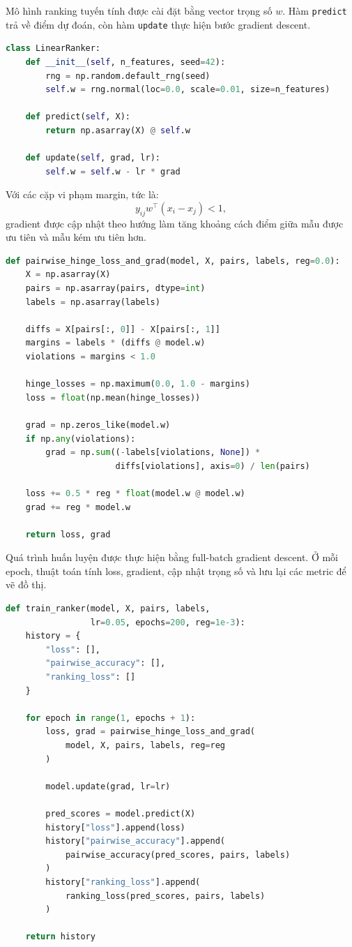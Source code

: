Mô hình ranking tuyến tính được cài đặt bằng vector trọng số \(w\). Hàm \texttt{predict} trả về điểm dự đoán, còn hàm \texttt{update} thực hiện bước gradient descent.

\begin{lstlisting}[language=Python, caption={Mô hình scoring tuyến tính cho pairwise ranking}]
class LinearRanker:
    def __init__(self, n_features, seed=42):
        rng = np.random.default_rng(seed)
        self.w = rng.normal(loc=0.0, scale=0.01, size=n_features)

    def predict(self, X):
        return np.asarray(X) @ self.w

    def update(self, grad, lr):
        self.w = self.w - lr * grad
\end{lstlisting}

Với các cặp vi phạm margin, tức là:
\[
    y_{ij}w^\top(x_i-x_j)<1,
\]
gradient được cập nhật theo hướng làm tăng khoảng cách điểm giữa mẫu được ưu tiên và mẫu kém ưu tiên hơn.

\begin{lstlisting}[language=Python, caption={Pairwise hinge loss và gradient}]
def pairwise_hinge_loss_and_grad(model, X, pairs, labels, reg=0.0):
    X = np.asarray(X)
    pairs = np.asarray(pairs, dtype=int)
    labels = np.asarray(labels)

    diffs = X[pairs[:, 0]] - X[pairs[:, 1]]
    margins = labels * (diffs @ model.w)
    violations = margins < 1.0

    hinge_losses = np.maximum(0.0, 1.0 - margins)
    loss = float(np.mean(hinge_losses))

    grad = np.zeros_like(model.w)
    if np.any(violations):
        grad = np.sum((-labels[violations, None]) *
                      diffs[violations], axis=0) / len(pairs)

    loss += 0.5 * reg * float(model.w @ model.w)
    grad += reg * model.w

    return loss, grad
\end{lstlisting}

Quá trình huấn luyện được thực hiện bằng full-batch gradient descent. Ở mỗi epoch, thuật toán tính loss, gradient, cập nhật trọng số và lưu lại các metric để vẽ đồ thị.

\begin{lstlisting}[language=Python, caption={Vòng lặp huấn luyện bằng gradient descent}]
def train_ranker(model, X, pairs, labels,
                 lr=0.05, epochs=200, reg=1e-3):
    history = {
        "loss": [],
        "pairwise_accuracy": [],
        "ranking_loss": []
    }

    for epoch in range(1, epochs + 1):
        loss, grad = pairwise_hinge_loss_and_grad(
            model, X, pairs, labels, reg=reg
        )

        model.update(grad, lr=lr)

        pred_scores = model.predict(X)
        history["loss"].append(loss)
        history["pairwise_accuracy"].append(
            pairwise_accuracy(pred_scores, pairs, labels)
        )
        history["ranking_loss"].append(
            ranking_loss(pred_scores, pairs, labels)
        )

    return history
\end{lstlisting}

